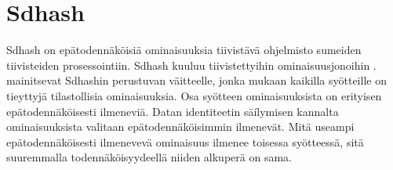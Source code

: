 \section{Sdhash}

Sdhash on epätodennäköisiä ominaisuuksia tiivistävä ohjelmisto sumeiden tiivisteiden
prosessointiin. Sdhash kuuluu tiivistettyihin ominaisuusjonoihin \parencite{martin-perez21}.
\textcite{naik19} mainitsevat Sdhashin perustuvan väitteelle, jonka mukaan kaikilla syötteille
on tieyttyjä tilastollisia ominaisuuksia. Osa syötteen ominaisuuksista on erityisen epätodennäköisesti ilmeneviä. Datan identiteetin säílymisen kannalta ominaisuuksista valitaan epätodennäköisimmin
ilmenevät. Mitä useampi epätodennäköisesti ilmenevevä ominaisuus ilmenee toisessa syötteessä,
sitä suuremmalla todennäköisyydeellä niiden alkuperä on sama. 

